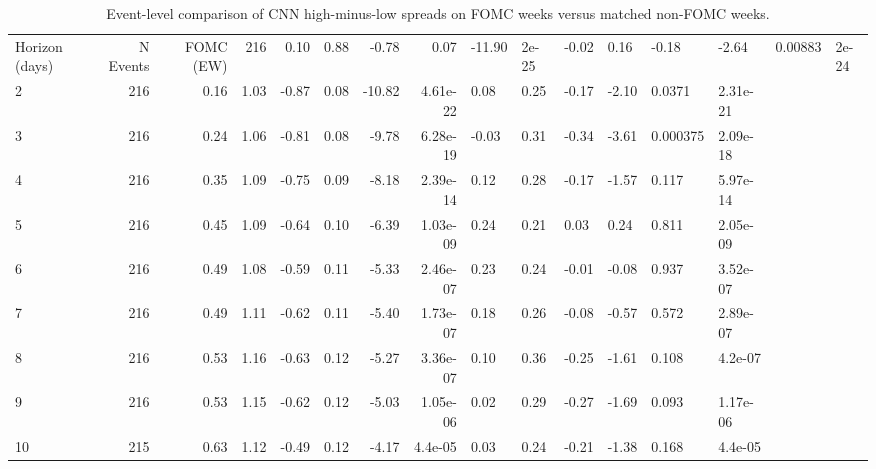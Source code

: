 \begin{table}[ht]
\centering
\caption{Event-level comparison of CNN high-minus-low spreads on FOMC weeks versus matched non-FOMC weeks.}
\label{tab:fomc_vs_matched}
\begin{tabular}{lrrrrrrrlllll}
\toprule
Horizon (days) & N Events & FOMC (EW) %
 & 216 & 0.10 & 0.88 & -0.78 & 0.07 & -11.90 & 2e-25 & -0.02 & 0.16 & -0.18 & -2.64 & 0.00883 & 2e-24 \\
2 & 216 & 0.16 & 1.03 & -0.87 & 0.08 & -10.82 & 4.61e-22 & 0.08 & 0.25 & -0.17 & -2.10 & 0.0371 & 2.31e-21 \\
3 & 216 & 0.24 & 1.06 & -0.81 & 0.08 & -9.78 & 6.28e-19 & -0.03 & 0.31 & -0.34 & -3.61 & 0.000375 & 2.09e-18 \\
4 & 216 & 0.35 & 1.09 & -0.75 & 0.09 & -8.18 & 2.39e-14 & 0.12 & 0.28 & -0.17 & -1.57 & 0.117 & 5.97e-14 \\
5 & 216 & 0.45 & 1.09 & -0.64 & 0.10 & -6.39 & 1.03e-09 & 0.24 & 0.21 & 0.03 & 0.24 & 0.811 & 2.05e-09 \\
6 & 216 & 0.49 & 1.08 & -0.59 & 0.11 & -5.33 & 2.46e-07 & 0.23 & 0.24 & -0.01 & -0.08 & 0.937 & 3.52e-07 \\
7 & 216 & 0.49 & 1.11 & -0.62 & 0.11 & -5.40 & 1.73e-07 & 0.18 & 0.26 & -0.08 & -0.57 & 0.572 & 2.89e-07 \\
8 & 216 & 0.53 & 1.16 & -0.63 & 0.12 & -5.27 & 3.36e-07 & 0.10 & 0.36 & -0.25 & -1.61 & 0.108 & 4.2e-07 \\
9 & 216 & 0.53 & 1.15 & -0.62 & 0.12 & -5.03 & 1.05e-06 & 0.02 & 0.29 & -0.27 & -1.69 & 0.093 & 1.17e-06 \\
10 & 215 & 0.63 & 1.12 & -0.49 & 0.12 & -4.17 & 4.4e-05 & 0.03 & 0.24 & -0.21 & -1.38 & 0.168 & 4.4e-05 \\
\bottomrule
\end{tabular}
\end{table}
